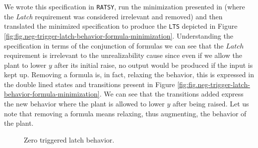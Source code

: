 We wrote this specification in \texttt{RATSY}, run the minimization presented in
\cite{DBLP:conf/hvc/KonighoferHB10} (where the \textit{Latch} requirement was
considered irrelevant and removed) and then translated the minimized specification
to produce the \texttt{LTS} depicted in Figure 
\ref{fig:fig.neg-trigger-latch-behavior-formula-minimization}.  Understanding the specification
in terms of the conjunction of formulas we can see that the $Latch$ requirement is irrelevant
to the unrealizability cause since even if we allow the plant to lower $y$ after its initial
raise, no output would be produced if the input is kept up.  Removing a formula is, in fact,
relaxing the behavior, this is expressed in the double lined states and transitions 
present in Figure \ref{fig:fig.neg-trigger-latch-behavior-formula-minimization}.  
We can see that the transitions added express the new behavior where the plant is allowed
to lower $y$ after being raised.  Let us note that removing a formula means relaxing, 
thus augmenting, the behavior of the plant.
\begin{figure}[bt]
\centering
\SmallPicture
{}
\vspace*{-2mm}
\caption{Zero triggered latch behavior.}
\label{fig:fig.neg-trigger-latch-behavior}
\vspace*{-4mm}
\MediumPicture
\end{figure}

